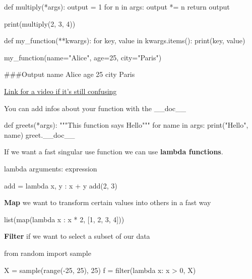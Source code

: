 \begin{pythoncode}
    def multiply(*args):
        output = 1
        for n in args:
            output *= n
        return output

    print(multiply(2, 3, 4))

    
\end{pythoncode}

\begin{pythoncode}
    def my_function(**kwargs):
        for key, value in kwargs.items():
            print(key, value)

    my_function(name="Alice", age=25, city="Paris")

    ###Output
name Alice
age 25
city Paris
\end{pythoncode}

\href{https://youtu.be/4jBJhCaNrWU?si=h0v33a0kZZ5CMMfV}{Link for a video if it's still confusing}

\vspace{10pt}

You can add infos about your function with the \_\_doc\_\_

\begin{pythoncode}
    def greets(*args):
        """This function says Hello"""
        for name in args:
            print("Hello", name)
    greet.__doc__
\end{pythoncode}

\vspace{10pt}

If we want a fast singular use function we can use \textbf{lambda functions}.

\begin{pythoncode}
    lambda arguments: expression

    add = lambda x, y : x + y
    add(2, 3)
\end{pythoncode}

\vspace{10pt}

\textbf{Map} \ra we want to transform certain values into others in a fast way

\begin{pythoncode}
    list(map(lambda x : x * 2, [1, 2, 3, 4]))
\end{pythoncode}

\vspace{10pt}

\textbf{Filter} \ra if we want to select a subset of our data

\begin{pythoncode}
    from random import sample

    X = sample(range(-25, 25), 25)
    f = filter(lambda x: x > 0, X)
\end{pythoncode}


